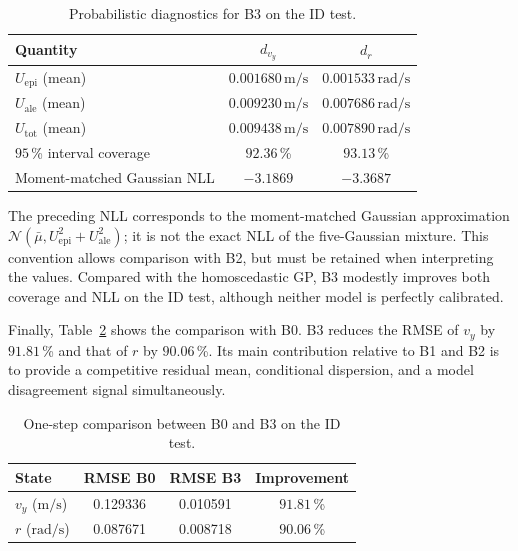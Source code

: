 \documentclass[12pt,a4paper]{report}
\begin{document}
\begin{table}[htbp]
    \centering
    \caption{Probabilistic diagnostics for B3 on the ID test.}
    \label{tab:b3_uncertainty_diagnostics}
    \begin{tabular}{@{}lcc@{}}
        \toprule
        Quantity & $d_{v_y}$ & $d_r$ \\
        \midrule
        $U_{\mathrm{epi}}$ (mean)
            & $0.001680\,\mathrm{m/s}$ & $0.001533\,\mathrm{rad/s}$ \\
        $U_{\mathrm{ale}}$ (mean)
            & $0.009230\,\mathrm{m/s}$ & $0.007686\,\mathrm{rad/s}$ \\
        $U_{\mathrm{tot}}$ (mean)
            & $0.009438\,\mathrm{m/s}$ & $0.007890\,\mathrm{rad/s}$ \\
        $95$\,\% interval coverage
            & $92.36$\,\% & $93.13$\,\% \\
        Moment-matched Gaussian NLL
            & $-3.1869$ & $-3.3687$ \\
        \bottomrule
    \end{tabular}
\end{table}

The preceding NLL corresponds to the moment-matched Gaussian approximation $\mathcal{N}(\bar{\mu},U^2_{\mathrm{epi}}+U^2_{\mathrm{ale}})$; it is not the exact NLL of the five-Gaussian mixture. This convention allows comparison with B2, but must be retained when interpreting the values. Compared with the homoscedastic GP, B3 modestly improves both coverage and NLL on the ID test, although neither model is perfectly calibrated.

Finally, Table~\ref{tab:b3_physics_hybrid_comparison} shows the comparison with B0. B3 reduces the RMSE of $v_y$ by $91.81$\,\% and that of $r$ by $90.06$\,\%. Its main contribution relative to B1 and B2 is to provide a competitive residual mean, conditional dispersion, and a model disagreement signal simultaneously.

\begin{table}[htbp]
    \centering
    \caption{One-step comparison between B0 and B3 on the ID test.}
    \label{tab:b3_physics_hybrid_comparison}
    \begin{tabular}{@{}lccc@{}}
        \toprule
        State & RMSE B0 & RMSE B3 & Improvement \\
        \midrule
        $v_y$ ($\mathrm{m/s}$) & 0.129336 & 0.010591 & $91.81$\,\% \\
        $r$ ($\mathrm{rad/s}$) & 0.087671 & 0.008718 & $90.06$\,\% \\
        \bottomrule
    \end{tabular}
\end{table}
\end{document}
